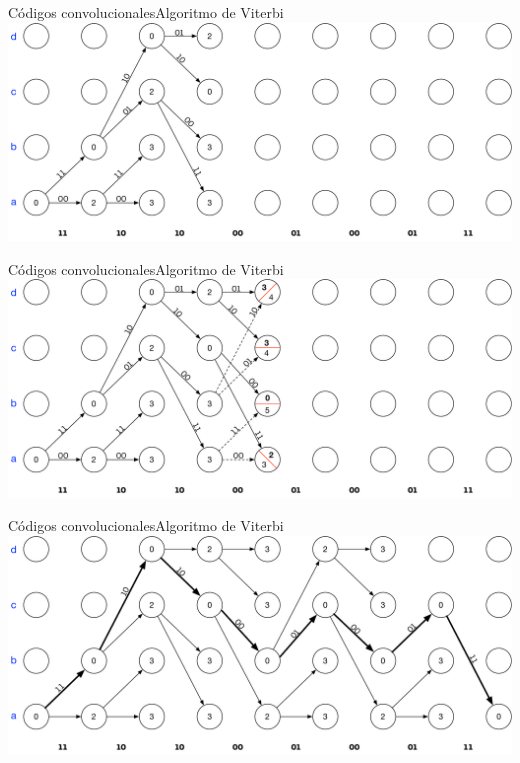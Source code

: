 \documentclass[10pt,compress]{beamer} %
\begin{document}
\begin{frame}{Códigos convolucionales}{Algoritmo de Viterbi}
  \centering \includegraphics[width=0.8\linewidth]{Figuras/Viterbi_3.pdf}
\end{frame}

\begin{frame}{Códigos convolucionales}{Algoritmo de Viterbi}
  \centering \includegraphics[width=0.8\linewidth]{Figuras/Viterbi_4.pdf}
\end{frame}

\begin{frame}{Códigos convolucionales}{Algoritmo de Viterbi}
  \centering \includegraphics[width=0.8\linewidth]{Figuras/Viterbi_5.pdf}
\end{frame}
\end{document}
